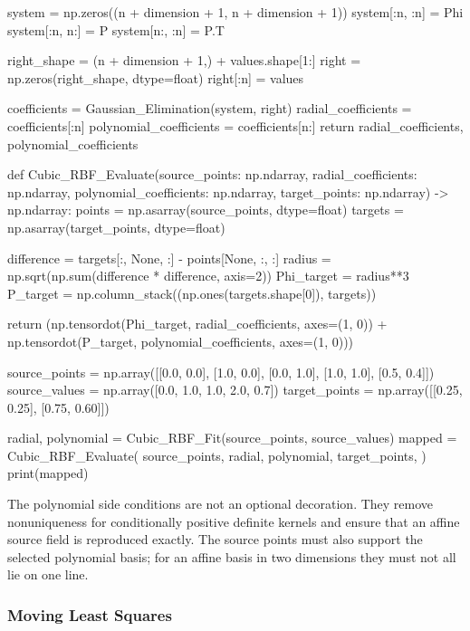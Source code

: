 \begin{python}
    system = np.zeros((n + dimension + 1, n + dimension + 1))
    system[:n, :n] = Phi
    system[:n, n:] = P
    system[n:, :n] = P.T

    right_shape = (n + dimension + 1,) + values.shape[1:]
    right = np.zeros(right_shape, dtype=float)
    right[:n] = values

    coefficients = Gaussian_Elimination(system, right)
    radial_coefficients = coefficients[:n]
    polynomial_coefficients = coefficients[n:]
    return radial_coefficients, polynomial_coefficients


def Cubic_RBF_Evaluate(source_points: np.ndarray,
                       radial_coefficients: np.ndarray,
                       polynomial_coefficients: np.ndarray,
                       target_points: np.ndarray) -> np.ndarray:
    points = np.asarray(source_points, dtype=float)
    targets = np.asarray(target_points, dtype=float)

    difference = targets[:, None, :] - points[None, :, :]
    radius = np.sqrt(np.sum(difference * difference, axis=2))
    Phi_target = radius**3
    P_target = np.column_stack((np.ones(targets.shape[0]), targets))

    return (np.tensordot(Phi_target, radial_coefficients, axes=(1, 0))
            + np.tensordot(P_target, polynomial_coefficients, axes=(1, 0)))


source_points = np.array([[0.0, 0.0],
                          [1.0, 0.0],
                          [0.0, 1.0],
                          [1.0, 1.0],
                          [0.5, 0.4]])
source_values = np.array([0.0, 1.0, 1.0, 2.0, 0.7])
target_points = np.array([[0.25, 0.25], [0.75, 0.60]])

radial, polynomial = Cubic_RBF_Fit(source_points, source_values)
mapped = Cubic_RBF_Evaluate(
    source_points,
    radial,
    polynomial,
    target_points,
)
print(mapped)
\end{python}

The polynomial side conditions are not an optional decoration. They remove
nonuniqueness for conditionally positive definite kernels and ensure that an
affine source field is reproduced exactly. The source points must also support
the selected polynomial basis; for an affine basis in two dimensions they must
not all lie on one line.

\subsubsection{Moving Least Squares}

